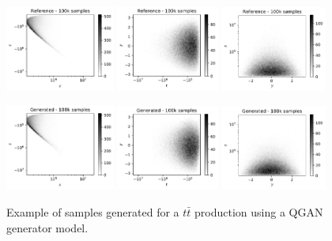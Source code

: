 \documentclass[twocolumn,preprintnumbers,superscriptaddress]{revtex4-2}
\begin{document}
\begin{figure}
  \includegraphics[width=0.32\textwidth]{plots/LHCttbar/s-t_REAL_100k.pdf}%
  \includegraphics[width=0.3\textwidth]{plots/LHCttbar/t-y_REAL_100k.pdf}%
  \includegraphics[width=0.31\textwidth]{plots/LHCttbar/y-s_REAL_100k.pdf}

  \includegraphics[width=0.32\textwidth]{plots/LHCttbar/s-t_FAKE_100k.pdf}%
  \includegraphics[width=0.3\textwidth]{plots/LHCttbar/t-y_FAKE_100k.pdf}%
  \includegraphics[width=0.31\textwidth]{plots/LHCttbar/y-s_FAKE_100k.pdf}

  \caption{\label{fig:3dgauss}Example of samples generated for a $t\bar{t}$
    production using a QGAN generator model.}
\end{figure}
\end{document}
